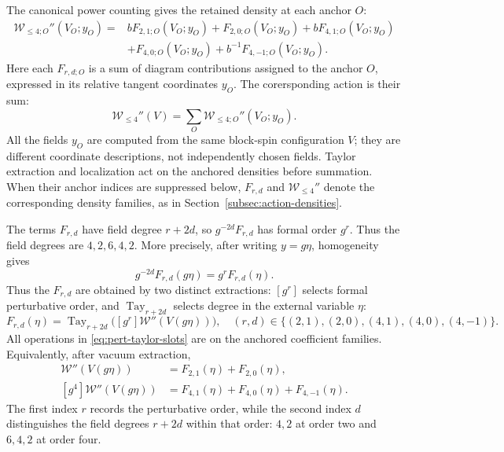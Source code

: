 \documentclass[11pt]{article}
\newcommand{\proj}{\operatorname{proj}}
\newcommand{\Tay}{\operatorname{Tay}}
\numberwithin{equation}{section}
\theoremstyle{definition}
\theoremstyle{plain}
\begin{document}
The canonical power counting gives the retained density at each
anchor $O$:
\begin{equation}
 \begin{aligned}
 \mathcal W_{\le4;O}''(V_O;y_O)
 ={}&
 bF_{2,1;O}(V_O;y_O)+F_{2,0;O}(V_O;y_O)
   +bF_{4,1;O}(V_O;y_O)\\
 &+F_{4,0;O}(V_O;y_O)+b^{-1}F_{4,-1;O}(V_O;y_O).
 \end{aligned}
 \label{eq:pert-sorted}
\end{equation}
Here each $F_{r,d;O}$ is a sum of diagram contributions assigned to
the anchor $O$, expressed in its relative tangent coordinates $y_O$.
The corersponding action is their sum:
\begin{equation}
 \mathcal W_{\le4}''(V)
   =\sum_O\mathcal W_{\le4;O}''(V_O;y_O).
\end{equation}
All the fields $y_O$ are computed from the same block-spin
configuration $V$; they are different coordinate descriptions,
not independently chosen fields.
Taylor extraction and localization act on the anchored densities
before summation.  When their anchor indices are suppressed below,
$F_{r,d}$ and $\mathcal W_{\le4}''$ denote the corresponding
density families, as in Section~\ref{subsec:action-densities}.


The terms $F_{r,d}$ have field degree $r+2d$, so $g^{-2d}F_{r,d}$
has formal order $g^r$.  Thus the field degrees are $4,2,6,4,2$.
More precisely, after writing $y=g\eta$, homogeneity gives
\begin{equation}
 g^{-2d}F_{r,d}(g\eta)=g^rF_{r,d}(\eta).
\end{equation}
Thus the $F_{r,d}$ are obtained by two distinct extractions:
$[g^r]$ selects formal perturbative order, and $\Tay_{r+2d}$
selects degree in the external variable $\eta$:
\begin{equation}
 F_{r,d}(\eta)
   =\Tay_{r+2d}\bigl([g^r]\mathcal W''(V(g\eta))\bigr),
 \quad
 (r,d)\in\{(2,1),(2,0),(4,1),(4,0),(4,-1)\}.
 \label{eq:pert-taylor-slots}
\end{equation}
All operations in \eqref{eq:pert-taylor-slots} are on the
anchored coefficient families.  Equivalently, after vacuum
extraction,
\begin{align}
 [g^2]\mathcal W''(V(g\eta))
 &=F_{2,1}(\eta)+F_{2,0}(\eta),\\
 [g^4]\mathcal W''(V(g\eta))
 &=F_{4,1}(\eta)+F_{4,0}(\eta)+F_{4,-1}(\eta).
\end{align}
The first index $r$ records the perturbative order, while the second index $d$
distinguishes the field degrees $r+2d$ within that order:
$4,2$ at order two and $6,4,2$ at order four.
\end{document}
